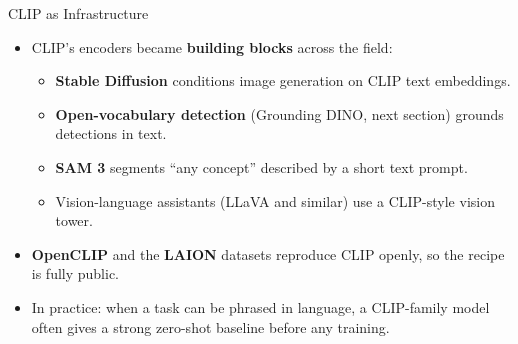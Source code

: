 \begin{frame}{CLIP as Infrastructure}
  \begin{itemize}\itemsep0.3em
    \item CLIP's encoders became \textbf{building blocks} across the field:
    \begin{itemize}\itemsep0.15em
      \item \textbf{Stable Diffusion} conditions image generation on CLIP text embeddings.
      \item \textbf{Open-vocabulary detection} (Grounding DINO, next section) grounds detections in text.
      \item \textbf{SAM 3} segments ``any concept'' described by a short text prompt.
      \item Vision-language assistants (LLaVA and similar) use a CLIP-style vision tower.
    \end{itemize}
    \item \textbf{OpenCLIP} and the \textbf{LAION} datasets reproduce CLIP openly, so the recipe is fully public.
    \item In practice: when a task can be phrased in language, a CLIP-family model often gives a strong zero-shot baseline before any training.
  \end{itemize}
\end{frame}
